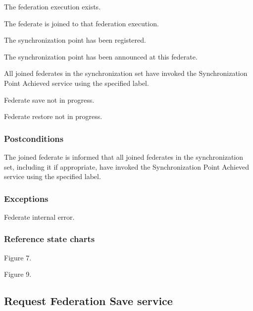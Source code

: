 \begin{stdalphalist}
    \item The federation execution exists.
    \item The federate is joined to that federation execution.
    \item The synchronization point has been registered.
    \item The synchronization point has been announced at this federate.
    \item All joined federates in the synchronization set have invoked the Synchronization Point Achieved service using the specified label.
    \item Federate save not in progress.
    \item Federate restore not in progress.
\end{stdalphalist}

\subsubsection{Postconditions}

\begin{stdalphalist}
    \item The joined federate is informed that all joined federates in the synchronization set, including it if appropriate, have invoked the Synchronization Point Achieved service using the specified label.
\end{stdalphalist}

\subsubsection{Exceptions}

\begin{stdalphalist}
    \item Federate internal error.
\end{stdalphalist}

\subsubsection{Reference state charts}

\begin{stdalphalist}
    \item Figure 7.
    \item Figure 9.
\end{stdalphalist}

\subsection{Request Federation Save service}


